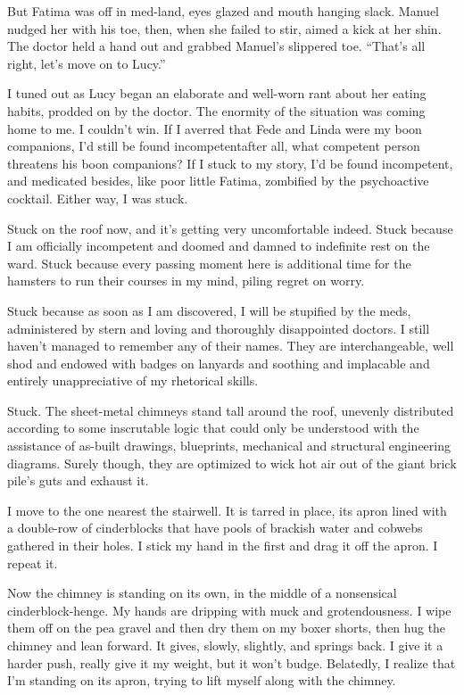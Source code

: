 But Fatima was off in med-land, eyes glazed and mouth hanging
slack. Manuel nudged her with his toe, then, when she failed to
stir, aimed a kick at her shin. The doctor held a hand out and
grabbed Manuel’s slippered toe. “That’s all right, let’s move on to
Lucy.”

I tuned out as Lucy began an elaborate and well-worn rant about her
eating habits, prodded on by the doctor. The enormity of the
situation was coming home to me. I couldn’t win. If I averred that
Fede and Linda were my boon companions, I’d still be found
incompetent{\dash}after all, what competent person threatens his boon
companions? If I stuck to my story, I’d be found incompetent, and
medicated besides, like poor little Fatima, zombified by the
psychoactive cocktail. Either way, I was stuck.

Stuck on the roof now, and it’s getting very uncomfortable indeed.
Stuck because I am officially incompetent and doomed and damned to
indefinite rest on the ward. Stuck because every passing moment
here is additional time for the hamsters to run their courses in my
mind, piling regret on worry.

Stuck because as soon as I am discovered, I will be stupified by
the meds, administered by stern and loving and thoroughly
disappointed doctors. I still haven’t managed to remember any of
their names. They are interchangeable, well shod and endowed with
badges on lanyards and soothing and implacable and entirely
unappreciative of my rhetorical skills.

Stuck. The sheet-metal chimneys stand tall around the roof,
unevenly distributed according to some inscrutable logic that could
only be understood with the assistance of as-built drawings,
blueprints, mechanical and structural engineering diagrams. Surely
though, they are optimized to wick hot air out of the giant brick
pile’s guts and exhaust it.

I move to the one nearest the stairwell. It is tarred in place, its
apron lined with a double-row of cinderblocks that have pools of
brackish water and cobwebs gathered in their holes. I stick my hand
in the first and drag it off the apron. I repeat it.

Now the chimney is standing on its own, in the middle of a
nonsensical cinderblock-henge. My hands are dripping with muck and
grotendousness. I wipe them off on the pea gravel and then dry them
on my boxer shorts, then hug the chimney and lean forward. It
gives, slowly, slightly, and springs back. I give it a harder push,
really give it my weight, but it won’t budge. Belatedly, I realize
that I’m standing on its apron, trying to lift myself along with
the chimney.

